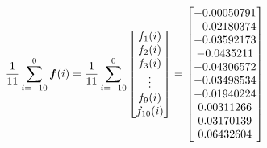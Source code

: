 \documentclass{article}
\begin{document}
\begin{enumerate}
        \begin{equation} 
            \begin{aligned}
                \frac{1}{11}\sum_{i=-10}^0\bm{f}(i) = \frac{1}{11}\sum_{i=-10}^0
                    \begin{bmatrix} 
                        f_1(i) \\
                        f_2(i) \\
                        f_3(i) \\
                        \vdots \\
                        f_9(i) \\
                        f_{10}(i) 
                    \end{bmatrix}
                    = 
                    \begin{bmatrix} 
                        -0.00050791 \\
                        -0.02180374 \\
                        -0.03592173 \\
                        -0.0435211 \\
                        -0.04306572 \\
                        -0.03498534 \\
                        -0.01940224 \\
                        0.00311266 \\
                        0.03170139 \\
                        0.06432604
                    \end{bmatrix} \notag
            \end{aligned}
        \end{equation}

        \vspace{0.5cm}
        \vspace{0.5cm}

\end{enumerate}
\end{document}
